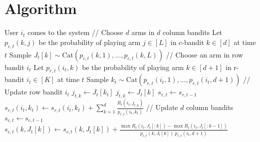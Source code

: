 
\section{Algorithm}
\label{sec:algorithm}

\begin{algorithm}
  \begin{algorithmic}[1]
      \State User $i_t$ comes to the system
      \State
      \State // Choose $d$ arms in $d$ column bandits
      \State Let $p_{c, t}(k, j)$ be the probability of playing arm $j \in [L]$ in c-bandit $k \in [d]$ at time $t$
        \State Sample $J_t[k] \sim \mathrm{Cat}(p_{c, t}(k, 1), \dots, p_{c, t}(k, L))$
      \EndFor
      \State
      \State // Choose an arm in row bandit $i_t$
      \State Let $p_{r, t}(i_t, k)$ be the probability of playing arm $k \in [d + 1]$ in r-bandit $i_t \in [K]$ at time $t$
      \State Sample $k_t \sim \mathrm{Cat}(p_{r, t}(i_t, 1), \dots, p_{r, t}(i_t, d + 1))$
      \State
      \State // Update row bandit $i_t$
          \State $j_{t, k} \gets J_t[k_t]$
        \Else
          \State $j_{t, k} \gets J_t[k]$
        \EndIf
      \EndFor
      \State $s_{r, t} \gets s_{r, t - 1}$
      \State $\displaystyle s_{r, t}(i_t, k_t) \gets s_{r, t}(i_t, k_t) + \sum_{k = 1}^d \frac{R_t(i_t, j_{t, k})}{p_{r, t}(i_t, k_t)}$
      \State
      \State // Update $d$ column bandits
      \State $s_{c, t} \gets s_{c, t - 1}$
          \State $\displaystyle
          s_{c, t}(k, J_t[k]) \gets s_{c, t}(k, J_t[k]) +
          \frac{\max R_t(i_t, J_t[: k]) - \max R_t(i_t, J_t[: k - 1])}{p_{c, t}(k, J_t[k]) \ p_{r, t}(i_t, d + 1)}$
        \EndFor
      \EndIf
    \EndFor
  \end{algorithmic}
\end{algorithm}
